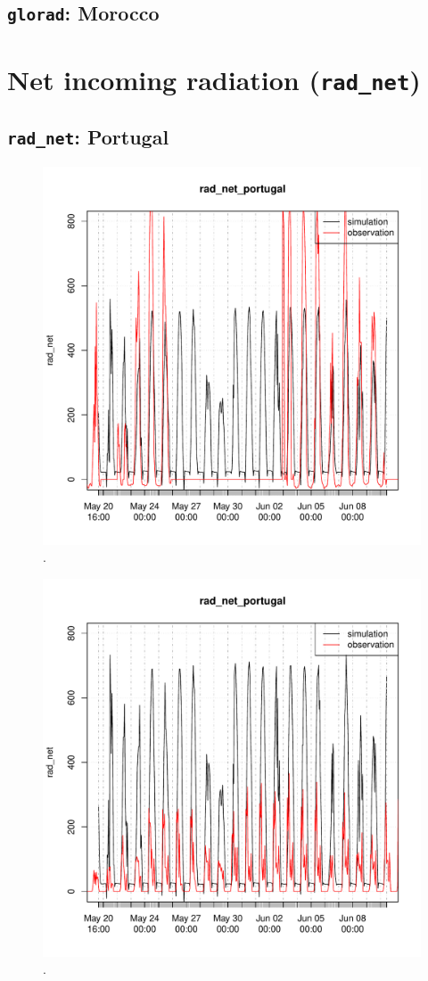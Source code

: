 \documentclass{scrreprt}
\begin{document}
\newpage
\subsection{\texttt{glorad}: Morocco}

\newpage
\section{Net incoming radiation (\texttt{rad\_net})}

\subsection{\texttt{rad\_net}: Portugal}

\begin{figure}[ht]
  \centering
  \includegraphics[width=0.5\hsize]{./fig/plot_rad_net_compare_portugal_HS_2014-04-29_2014-07-01.pdf}
  \caption{.}
  \label{fig:portugal_HS_radnet1}
\end{figure}

\begin{figure}[ht]
  \centering
  \includegraphics[width=0.5\hsize]{./fig/plot_rad_net_compare_portugal_NSA_2014-04-29_2014-07-01.pdf}
  \caption{.}
  \label{fig:portugal_NSA_radnet1}
\end{figure}
\end{document}
